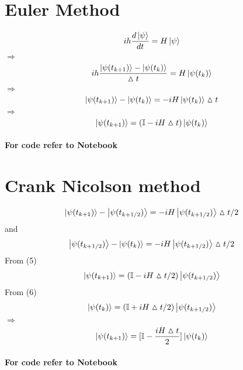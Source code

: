
\usepackage{amssymb}
\usepackage{listings}
\author{}

\section{Euler Method}
\begin{equation}
ih\frac{d\left| \psi \right>}{dt} = H\left| \psi \right>
\end{equation}
$\Longrightarrow$
\begin{equation}
ih\frac{\left| \psi(t_{k+1}) \right>-\left| \psi(t_{k}) \right>}{\vartriangle{t}} = H\left| \psi(t_{k}) \right>
\end{equation}
$\Longrightarrow$
\begin{equation}
\left| \psi(t_{k+1}) \right>-\left| \psi(t_{k}) \right> = -iH\left| \psi(t_{k}) \right>\vartriangle{t}
\end{equation}
$\Longrightarrow$
\begin{equation}
\left| \psi(t_{k+1}) \right> = (\mathbb{I}-iH\vartriangle{t})\left| \psi(t_{k}) \right>
\end{equation}

\paragraph{For code refer to Notebook}

\section{Crank Nicolson method}
\begin{equation}
\left| \psi(t_{k+1}) \right>-\left| \psi(t_{k+1/2}) \right> = -iH\left| \psi(t_{k+1/2}) \right>\vartriangle{t}/2
\end{equation}
and
\begin{equation}
\left| \psi(t_{k+1/2}) \right>-\left| \psi(t_{k}) \right> = -iH\left| \psi(t_{k+1/2}) \right>\vartriangle{t}/2
\end{equation}
From (5)
\begin{equation}
\left| \psi(t_{k+1}) \right> = (\mathbb{I}-iH\vartriangle{t}/2)\left| \psi(t_{k+1/2}) \right>
\end{equation}
From (6)
\begin{equation}
\left| \psi(t_{k}) \right> = (\mathbb{I}+iH\vartriangle{t}/2)\left| \psi(t_{k+1/2}) \right>
\end{equation}
$\Longrightarrow$
\begin{equation}
[\mathbb{I}+\frac{iH\vartriangle{t}}{2}]\ket{\psi(t_{k+1})} = [\mathbb{I}-\frac{iH\vartriangle{t}}{2}]\ket{\psi(t_{k})}
\end{equation}

\paragraph{For code refer to Notebook}

